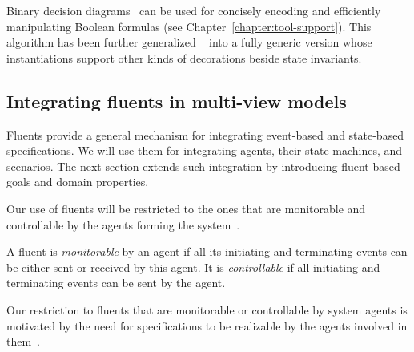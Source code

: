Binary decision diagrams~\cite{Bryant:1986} can be used for concisely encoding and efficiently manipulating Boolean formulas (see Chapter~\ref{chapter:tool-support}). This algorithm has been further generalized ~\cite{Damas:2011} into a fully generic version whose instantiations support other kinds of decorations beside state invariants.

\subsection{Integrating fluents in multi-view models}

Fluents provide a general mechanism for integrating event-based and state-based specifications. We will use them for integrating agents, their state machines, and scenarios. The next section extends such integration by introducing fluent-based goals and domain properties.

Our use of fluents will be restricted to the ones that are monitorable and controllable by the agents forming the system~\cite{Letier:2002}. 

A fluent is \emph{monitorable} by an agent if all its initiating and terminating events can be either sent or received by this agent. It is \emph{controllable} if all initiating and terminating events can be sent by the agent. 

Our restriction to fluents that are monitorable or controllable by system agents is motivated by the need for specifications  to be realizable by the agents involved in them~\cite{Letier:2002}.

